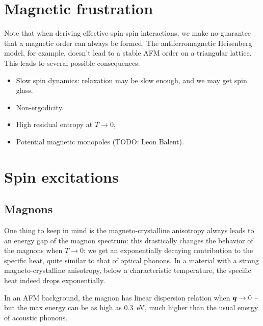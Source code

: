 \documentclass[hyperref, a4paper]{article}
\begin{document}
\section{Magnetic frustration}

Note that when deriving effective spin-spin interactions, 
we make no guarantee that 
a magnetic order can always be formed. 
The antiferromagnetic Heisenberg model, for example, 
doesn't lead to a stable AFM order on a triangular lattice. 
This leads to several possible consequences:
\begin{itemize}
    \item Slow spin dynamics: 
        relaxation may be slow enough,
        and we may get spin glass.
    \item Non-ergodicity.
    \item High residual entropy at $T \to 0$,
    \item Potential magnetic monopoles
     (TODO: Leon Balent). 
\end{itemize}

\section{Spin excitations}

\subsection{Magnons}

One thing to keep in mind is 
the magneto-crystalline anisotropy always leads to 
an energy gap of the magnon spectrum: 
this drastically changes the behavior of the magnons 
when $T \to 0$:
we get an exponentially decaying contribution to the specific heat,
quite similar to that of optical phonons. 
In a material with a strong magneto-crystalline anisotropy,
below a characteristic temperature,
the specific heat indeed drops exponentially.

In an AFM background, 
the magnon has linear dispersion relation when $\vb*{q} \to 0$ -- 
but the max energy can be as high as \SI{0.3}{eV},
much higher than the usual energy of acoustic phonons. 
\end{document}
